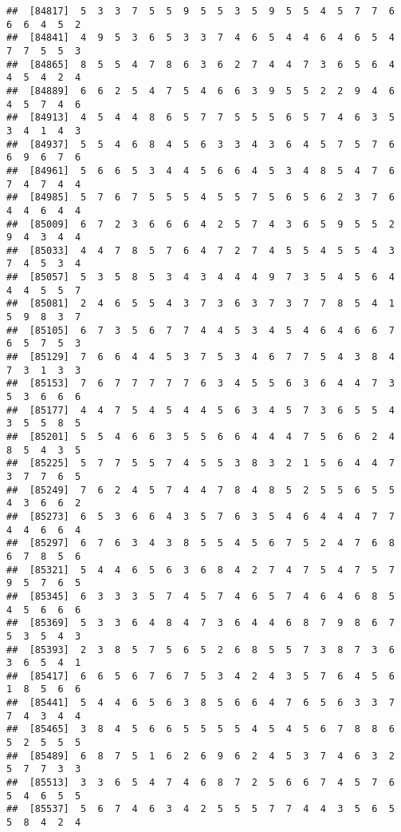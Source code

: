 \documentclass[
]{book}
\begin{document}
\begin{verbatim}
##  [84817]  5  3  3  7  5  5  9  5  5  3  5  9  5  5  4  5  7  7  6  6  6  4  5  2
##  [84841]  4  9  5  3  6  5  3  3  7  4  6  5  4  4  6  4  6  5  4  7  7  5  5  3
##  [84865]  8  5  5  4  7  8  6  3  6  2  7  4  4  7  3  6  5  6  4  4  5  4  2  4
##  [84889]  6  6  2  5  4  7  5  4  6  6  3  9  5  5  2  2  9  4  6  4  5  7  4  6
##  [84913]  4  5  4  4  8  6  5  7  7  5  5  5  6  5  7  4  6  3  5  3  4  1  4  3
##  [84937]  5  5  4  6  8  4  5  6  3  3  4  3  6  4  5  7  5  7  6  6  9  6  7  6
##  [84961]  5  6  6  5  3  4  4  5  6  6  4  5  3  4  8  5  4  7  6  7  4  7  4  4
##  [84985]  5  7  6  7  5  5  5  4  5  5  7  5  6  5  6  2  3  7  6  4  4  6  4  4
##  [85009]  6  7  2  3  6  6  6  4  2  5  7  4  3  6  5  9  5  5  2  9  4  3  4  4
##  [85033]  4  4  7  8  5  7  6  4  7  2  7  4  5  5  4  5  5  4  3  7  4  5  3  4
##  [85057]  5  3  5  8  5  3  4  3  4  4  4  9  7  3  5  4  5  6  4  4  4  5  5  7
##  [85081]  2  4  6  5  5  4  3  7  3  6  3  7  3  7  7  8  5  4  1  5  9  8  3  7
##  [85105]  6  7  3  5  6  7  7  4  4  5  3  4  5  4  6  4  6  6  7  6  5  7  5  3
##  [85129]  7  6  6  4  4  5  3  7  5  3  4  6  7  7  5  4  3  8  4  7  3  1  3  3
##  [85153]  7  6  7  7  7  7  7  6  3  4  5  5  6  3  6  4  4  7  3  5  3  6  6  6
##  [85177]  4  4  7  5  4  5  4  4  5  6  3  4  5  7  3  6  5  5  4  3  5  5  8  5
##  [85201]  5  5  4  6  6  3  5  5  6  6  4  4  4  7  5  6  6  2  4  8  5  4  3  5
##  [85225]  5  7  7  5  5  7  4  5  5  3  8  3  2  1  5  6  4  4  7  3  7  7  6  5
##  [85249]  7  6  2  4  5  7  4  4  7  8  4  8  5  2  5  5  6  5  5  4  3  6  6  2
##  [85273]  6  5  3  6  6  4  3  5  7  6  3  5  4  6  4  4  4  7  7  4  4  6  6  4
##  [85297]  6  7  6  3  4  3  8  5  5  4  5  6  7  5  2  4  7  6  8  6  7  8  5  6
##  [85321]  5  4  4  6  5  6  3  6  8  4  2  7  4  7  5  4  7  5  7  9  5  7  6  5
##  [85345]  6  3  3  3  5  7  4  5  7  4  6  5  7  4  6  4  6  8  5  4  5  6  6  6
##  [85369]  5  3  3  6  4  8  4  7  3  6  4  4  6  8  7  9  8  6  7  5  3  5  4  3
##  [85393]  2  3  8  5  7  5  6  5  2  6  8  5  5  7  3  8  7  3  6  3  6  5  4  1
##  [85417]  6  6  5  6  7  6  7  5  3  4  2  4  3  5  7  6  4  5  6  1  8  5  6  6
##  [85441]  5  4  4  6  5  6  3  8  5  6  6  4  7  6  5  6  3  3  7  7  4  3  4  4
##  [85465]  3  8  4  5  6  6  5  5  5  5  4  5  4  5  6  7  8  8  6  5  2  5  5  5
##  [85489]  6  8  7  5  1  6  2  6  9  6  2  4  5  3  7  4  6  3  2  5  7  7  3  3
##  [85513]  3  3  6  5  4  7  4  6  8  7  2  5  6  6  7  4  5  7  6  5  4  6  5  5
##  [85537]  5  6  7  4  6  3  4  2  5  5  5  7  7  4  4  3  5  6  5  5  8  4  2  4

\end{verbatim}
\end{document}
